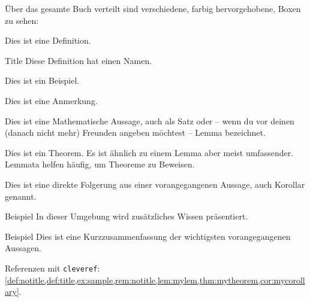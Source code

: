 \documentclass[../main.tex]{subfiles}
\begin{document}
\lipsum[2]

Über das gesamte Buch verteilt sind verschiedene, farbig hervorgehobene, Boxen zu sehen:
\begin{definition}{}
    Dies ist eine Definition.
\end{definition}
\begin{definition}{Title}
    Diese Definition hat einen Namen.
\end{definition}

\begin{example}[ex:sample]{}
    Dies ist ein Beispiel.    
\end{example}

\begin{remark}{}
    Dies ist eine Anmerkung.
\end{remark}

\begin{lemma}{}
    Dies ist eine Mathematische Aussage, auch als Satz oder -- wenn du vor deinen (danach nicht mehr) Freunden angeben möchtest -- Lemma bezeichnet.
\end{lemma}

\begin{theorem}{}
    Dies ist ein Theorem. Es ist ähnlich zu einem Lemma aber meist umfassender. Lemmata helfen häufig, um Theoreme zu Beweisen.
\end{theorem}

\begin{corollary}{}
    Dies ist eine direkte Folgerung aus einer vorangegangenen Aussage, auch Korollar genannt.
\end{corollary}

\begin{advanced}{Beispiel}
    In dieser Umgebung wird zusätzliches Wissen präsentiert.
\end{advanced}
\begin{nutshell}{Beispiel}
    Dies ist eine Kurzzusammenfassung der wichtigsten vorangegangenen Aussagen.
\end{nutshell}


Referenzen mit \texttt{cleveref}: \cref{def:notitle,def:title,ex:sample,rem:notitle,lem:mylem,thm:mytheorem,cor:mycorollary}.
\end{document}
